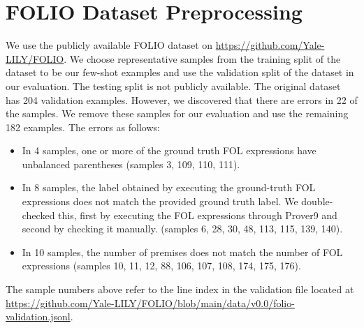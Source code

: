 \section{FOLIO Dataset Preprocessing}
\label{appendix_folio_dataset}
We use the publicly available FOLIO dataset on \url{https://github.com/Yale-LILY/FOLIO}. We choose representative samples from the training split of the dataset to be our few-shot examples and use the validation split of the dataset in our evaluation. The testing split is not publicly available. 
The original dataset has 204 validation examples. However, we discovered that there are errors in 22 of the samples. We remove these samples for our evaluation and use the remaining 182 examples. The errors as follows:
\begin{itemize}
    \item In 4 samples, one or more of the ground truth FOL expressions have unbalanced parentheses (samples 3, 109, 110, 111).
    \item In 8 samples, the label obtained by executing the ground-truth FOL expressions does not match the provided ground truth label. We double-checked this, first by executing the FOL expressions through Prover9 and second by checking it manually. (samples 6, 28, 30, 48, 113, 115, 139, 140). 
    \item In 10 samples, the number of premises does not match the number of FOL expressions (samples 10, 11, 12, 88, 106, 107, 108, 174, 175, 176).
\end{itemize}
The sample numbers above refer to the line index in the validation file located at \url{https://github.com/Yale-LILY/FOLIO/blob/main/data/v0.0/folio-validation.jsonl}.
